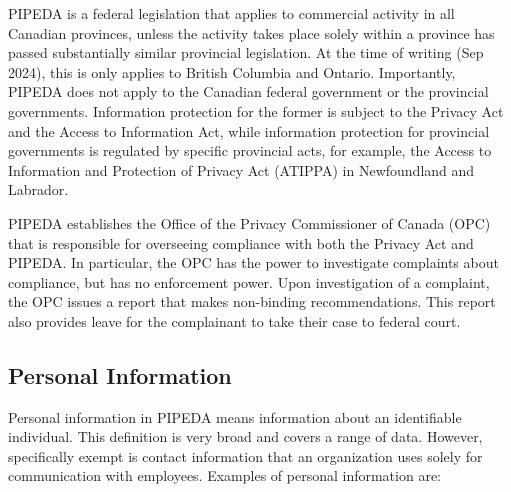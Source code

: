 PIPEDA is a federal legislation that applies to commercial activity in all Canadian provinces, unless the activity takes place solely within a province has passed substantially similar provincial legislation. At the time of writing (Sep 2024), this is only applies to British Columbia and Ontario. Importantly, PIPEDA does not apply to the Canadian federal government or the provincial governments. Information protection for the former is subject to the Privacy Act and the Access to Information Act, while information protection for provincial governments is regulated by specific provincial acts, for example, the Access to Information and Protection of Privacy Act (ATIPPA) in Newfoundland and Labrador.

PIPEDA establishes the Office of the Privacy Commissioner of Canada (OPC) that is responsible for overseeing compliance with both the Privacy Act and PIPEDA. In particular, the OPC has the power to investigate complaints about compliance, but has no enforcement power. Upon investigation of a complaint, the OPC issues a report that makes non-binding recommendations. This report also provides leave for the complainant to take their case to federal court. 

\subsection*{Personal Information}

Personal information in PIPEDA means information about an identifiable individual. This definition is very broad and covers a range of data. However, specifically exempt is contact information that an organization uses solely for communication with employees. Examples of personal information are:

